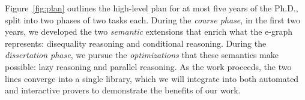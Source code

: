 Figure~\ref{fig:plan} outlines the high-level plan for at most five years of the
Ph.D., split into two phases of two tasks each. During the \textit{course phase},
in the first two years, we developed the two \textit{semantic} extensions that
enrich what the e-graph represents: disequality reasoning and conditional
reasoning. During the \textit{dissertation phase}, we pursue the
\textit{optimizations} that these semantics make possible: lazy reasoning and
parallel reasoning. As the work proceeds, the two lines converge into a single
library, which we will integrate into both automated and interactive provers to
demonstrate the benefits of our work.